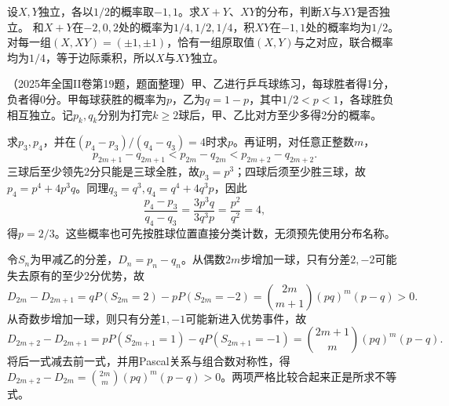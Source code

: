 设\(X,Y\)独立，各以\(1/2\)的概率取\(-1,1\)。求\(X+Y\)、\(XY\)的分布，判断\(X\)与\(XY\)是否独立。
\solutionanswer
和\(X+Y\)在\(-2,0,2\)处的概率为\(1/4,1/2,1/4\)，积\(XY\)在\(-1,1\)处的概率均为\(1/2\)。对每一组\((X,XY)=(\pm1,\pm1)\)，恰有一组原取值\((X,Y)\)与之对应，联合概率均为\(1/4\)，等于边际乘积，所以\(X\)与\(XY\)独立。


（2025年全国II卷第19题，题面整理）甲、乙进行乒乓球练习，每球胜者得1分，负者得0分。甲每球获胜的概率为\(p\)，乙为\(q=1-p\)，其中\(1/2<p<1\)，各球胜负相互独立。记\(p_k,q_k\)分别为打完\(k\ge2\)球后，甲、乙比对方至少多得2分的概率。

求\(p_3,p_4\)，并在\((p_4-p_3)/(q_4-q_3)=4\)时求\(p\)。再证明，对任意正整数\(m\)，
\[
 p_{2m+1}-q_{2m+1}<p_{2m}-q_{2m}<p_{2m+2}-q_{2m+2}.
\]
\solutionanswer
三球后至少领先2分只能是三球全胜，故\(p_3=p^3\)；四球后须至少胜三球，故\(p_4=p^4+4p^3q\)。同理\(q_3=q^3,q_4=q^4+4q^3p\)，因此
\[
 \frac{p_4-p_3}{q_4-q_3}=\frac{3p^3q}{3q^3p}=\frac{p^2}{q^2}=4,
\]
得\(p=2/3\)。这些概率也可先按胜球位置直接分类计数，无须预先使用分布名称。

令\(S_n\)为甲减乙的分差，\(D_n=p_n-q_n\)。从偶数\(2m\)步增加一球，只有分差\(2,-2\)可能失去原有的至少2分优势，故
\[
 D_{2m}-D_{2m+1}=qP(S_{2m}=2)-pP(S_{2m}=-2)
 =\binom{2m}{m+1}(pq)^m(p-q)>0.
\]
从奇数步增加一球，则只有分差\(1,-1\)可能新进入优势事件，故
\[
 D_{2m+2}-D_{2m+1}=pP(S_{2m+1}=1)-qP(S_{2m+1}=-1)
 =\binom{2m+1}{m}(pq)^m(p-q).
\]
将后一式减去前一式，并用Pascal关系与组合数对称性，得\(D_{2m+2}-D_{2m}=\binom{2m}{m}(pq)^m(p-q)>0\)。两项严格比较合起来正是所求不等式。
\par
